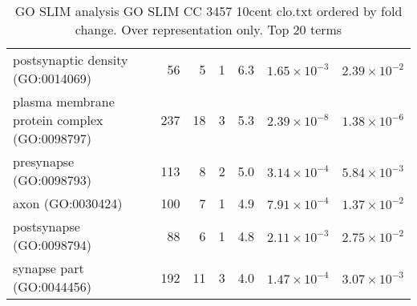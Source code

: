 \begin{table}[ht]
\begin{adjustbox}{width=\textwidth}
\begin{tabular}{lrrrrrr}
  postsynaptic density (GO:0014069) & 56 & 5 & 1 & 6.3 & $1.65 \times 10^{-3}$ & $2.39 \times 10^{-2}$ \\ 
  plasma membrane protein complex (GO:0098797) & 237 & 18 & 3 & 5.3 & $2.39 \times 10^{-8}$ & $1.38 \times 10^{-6}$ \\ 
  presynapse (GO:0098793) & 113 & 8 & 2 & 5.0 & $3.14 \times 10^{-4}$ & $5.84 \times 10^{-3}$ \\ 
  axon (GO:0030424) & 100 & 7 & 1 & 4.9 & $7.91 \times 10^{-4}$ & $1.37 \times 10^{-2}$ \\ 
  postsynapse (GO:0098794) & 88 & 6 & 1 & 4.8 & $2.11 \times 10^{-3}$ & $2.75 \times 10^{-2}$ \\ 
  synapse part (GO:0044456) & 192 & 11 & 3 & 4.0 & $1.47 \times 10^{-4}$ & $3.07 \times 10^{-3}$ \\ 
   \hline
\end{tabular}
\end{adjustbox}
\caption{GO SLIM analysis GO SLIM CC 3457 10cent clo.txt ordered by fold change. Over representation only. Top 20 terms} 
\label{tab:GO SLIM analysis GO SLIM CC 3457 10cent clo.txt ordered by fold change. Over representation only. Top 20 terms}
\end{table}
